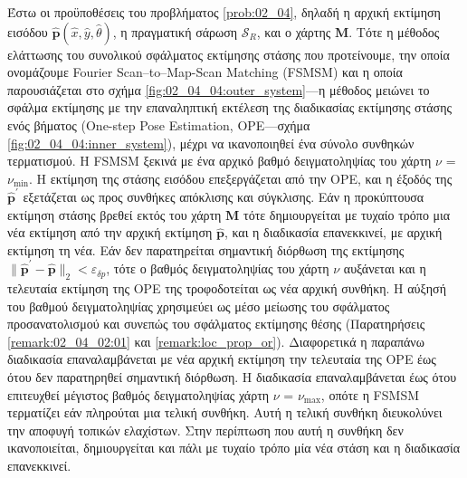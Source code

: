 Έστω οι προϋποθέσεις του προβλήματος \ref{prob:02_04}, δηλαδή η αρχική εκτίμηση
εισόδου $\hat{\bm{p}}(\hat{x}, \hat{y}, \hat{\theta})$, η πραγματική σάρωση
$\mathcal{S}_R$, και ο χάρτης $\bm{M}$. Τότε η μέθοδος ελάττωσης του συνολικού
σφάλματος εκτίμησης στάσης που προτείνουμε, την οποία ονομάζουμε Fourier
Scan--to--Map-Scan Matching (FSMSM) και η οποία παρουσιάζεται στο σχήμα
\ref{fig:02_04_04:outer_system}---η μέθοδος μειώνει το σφάλμα εκτίμησης με την
επαναληπτική εκτέλεση της διαδικασίας εκτίμησης στάσης ενός βήματος (One-step
Pose Estimation, OPE---σχήμα \ref{fig:02_04_04:inner_system}), μέχρι να
ικανοποιηθεί ένα σύνολο συνθηκών τερματισμού. Η FSMSM ξεκινά με ένα αρχικό
βαθμό δειγματοληψίας του χάρτη $\nu$ = $\nu_{\min}$. Η εκτίμηση της στάσης
εισόδου επεξεργάζεται από την OPE, και η έξοδός της $\hat{\bm{p}}^\prime$
εξετάζεται ως προς συνθήκες απόκλισης και σύγκλισης. Εάν η προκύπτουσα εκτίμηση
στάσης βρεθεί εκτός του χάρτη $\bm{M}$ τότε δημιουργείται με τυχαίο τρόπο μια
νέα εκτίμηση από την αρχική εκτίμηση $\hat{\bm{p}}$, και η διαδικασία
επανεκκινεί, με αρχική εκτίμηση τη νέα. Εάν δεν παρατηρείται σημαντική διόρθωση
της εκτίμησης $\|\hat{\bm{p}}^\prime-\hat{\bm{p}}\|_2 < \varepsilon_{\delta
p}$, τότε ο βαθμός δειγματοληψίας του χάρτη $\nu$ αυξάνεται και η τελευταία
εκτίμηση της OPE της τροφοδοτείται ως νέα αρχική συνθήκη. Η αύξησή του βαθμού
δειγματοληψίας χρησιμεύει ως μέσο μείωσης του σφάλματος προσανατολισμού και
συνεπώς του σφάλματος εκτίμησης θέσης (Παρατηρήσεις \ref{remark:02_04_02:01}
και \ref{remark:loc_prop_or}). Διαφορετικά η παραπάνω διαδικασία
επαναλαμβάνεται με νέα αρχική εκτίμηση την τελευταία της OPE έως ότου δεν
παρατηρηθεί σημαντική διόρθωση. Η διαδικασία επαναλαμβάνεται έως ότου
επιτευχθεί μέγιστος βαθμός δειγματοληψίας χάρτη $\nu$ = $\nu_{\max}$, οπότε η
FSMSM τερματίζει εάν πληρούται μια τελική συνθήκη. Αυτή η τελική συνθήκη
διευκολύνει την αποφυγή τοπικών ελαχίστων. Στην περίπτωση που αυτή η συνθήκη δεν
ικανοποιείται, δημιουργείται και πάλι με τυχαίο τρόπο μία νέα στάση και η
διαδικασία επανεκκινεί.


